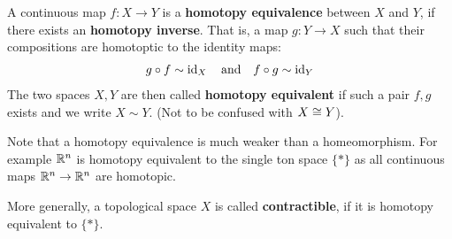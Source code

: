 \begin{dfn}[]
A continuous map $f: X \to  Y$ is a \textbf{homotopy equivalence} between $X$ and $Y$, if there exists an \textbf{homotopy inverse}. 
That is, a map $g: Y \to  X$ such that their compositions are homotoptic to the identity maps:
\begin{align*}
  g \circ f \sim \operatorname{id}_X \quad \text{and} \quad f \circ g \sim \operatorname{id}_Y
\end{align*}
The two spaces $X,Y$ are then called \textbf{homotopy equivalent} if such a pair $f,g$ exists and we write $X \sim Y$. (Not to be confused with $X \cong Y$).
\end{dfn}
Note that a homotopy equivalence is much weaker than a homeomorphism.
For example $\mathbb{R}^{n}$ is homotopy equivalent to the single ton space $\{\ast\}$
as all continuous maps $\mathbb{R}^{n} \to \mathbb{R}^{n}$ are homotopic.

More generally, a topological space $X$ is called \textbf{contractible}, if it is homotopy equivalent to $\{\ast\}$.

